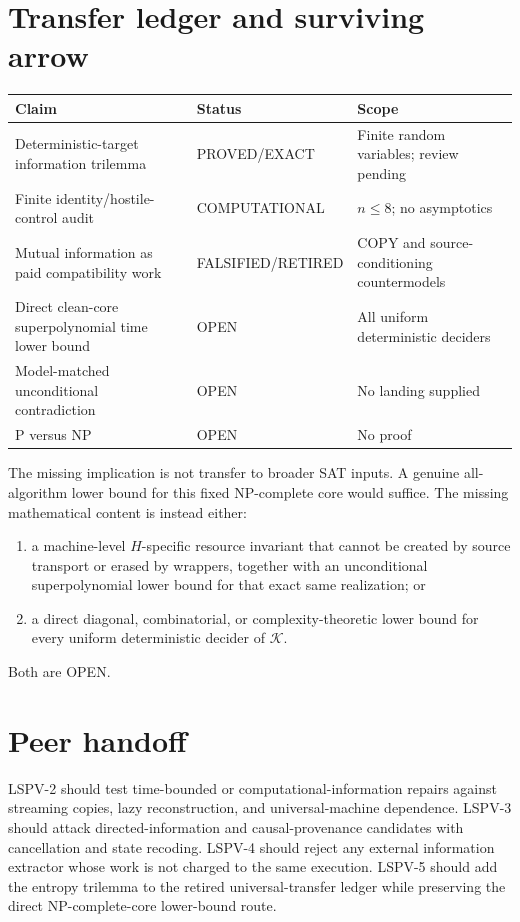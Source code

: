 \documentclass[11pt]{article}
\newcommand{\OPEN}{\textsf{OPEN}}
\newcommand{\EXACT}{\textsf{PROVED/EXACT}}
\newcommand{\COMP}{\textsf{COMPUTATIONAL}}
\newcommand{\RET}{\textsf{FALSIFIED/RETIRED}}
\begin{document}
\section*{Transfer ledger and surviving arrow}
\begin{center}
\begin{tabularx}{\textwidth}{p{}p{}X}
\toprule
Claim & Status & Scope\\
\midrule
Deterministic-target information trilemma & \EXACT{} & Finite random
variables; review pending\\
Finite identity/hostile-control audit & \COMP{} & $n\le8$; no asymptotics\\
Mutual information as paid compatibility work & \RET{} & COPY and
source-conditioning countermodels\\
Direct clean-core superpolynomial time lower bound & \OPEN{} & All uniform
deterministic deciders\\
Model-matched unconditional contradiction & \OPEN{} & No landing supplied\\
P versus NP & \OPEN{} & No proof\\
\bottomrule
\end{tabularx}
\end{center}

The missing implication is not transfer to broader SAT inputs.  A genuine
all-algorithm lower bound for this fixed NP-complete core would suffice.  The
missing mathematical content is instead either:
\begin{enumerate}
\item a machine-level $H$-specific resource invariant that cannot be created
by source transport or erased by wrappers, together with an unconditional
superpolynomial lower bound for that exact same realization; or
\item a direct diagonal, combinatorial, or complexity-theoretic lower bound
for every uniform deterministic decider of $\mathcal K$.
\end{enumerate}
Both are \OPEN{}.

\section*{Peer handoff}
LSPV-2 should test time-bounded or computational-information repairs against
streaming copies, lazy reconstruction, and universal-machine dependence.
LSPV-3 should attack directed-information and causal-provenance candidates
with cancellation and state recoding.  LSPV-4 should reject any external
information extractor whose work is not charged to the same execution.
LSPV-5 should add the entropy trilemma to the retired universal-transfer
ledger while preserving the direct NP-complete-core lower-bound route.
\end{document}
